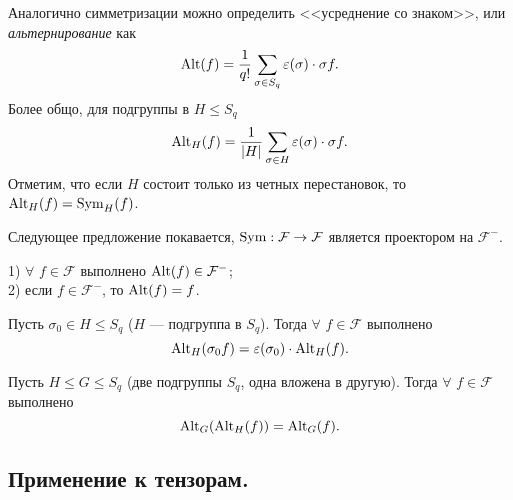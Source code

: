 
 
Аналогично симметризации можно определить <<усреднение со знаком>>, или {\it альтернирование} как
$$\mathop{\rm Alt}\nolimits (f) = \dfrac{1}{q!} \sum\limits_{\sigma \in S_q} \varepsilon(\sigma) \cdot \sigma f .$$
Более общо, %
для подгруппы в $H\leq S_q$
$$\mathop{\rm Alt}\nolimits_H(f) = \dfrac{1}{|H|} \sum\limits_{\sigma \in H} \varepsilon(\sigma) \cdot \sigma f .$$
Отметим, что если $H$ состоит только из четных перестановок, то $\mathop{\rm Alt}\nolimits_H(f) = \mathop{\rm Sym}\nolimits_H(f)$.



Следующее предложение покавается,  $\mathop{\rm Sym}\nolimits : \mathcal{F} \to \mathcal{F}$ является проектором на 
$\mathcal{F}^-$.

\begin{predl}
1) $\forall$ $f \in \mathcal{F} $ выполнено $\mathop{\rm Alt}\nolimits (f) \in \mathcal{F}^- $;\\
2) если $f \in \mathcal{F}^- $, то $\mathop{\rm Alt}\nolimits (f)=f$.
\end{predl}



\begin{lem}\label{premix_alt}
Пусть $\sigma_0 \in H \leq S_q$ ($H$ --- подгруппа в  $S_q$). Тогда
$\forall$ $f \in \mathcal{F} $ выполнено
$$\mathop{\rm Alt}\nolimits_H(\sigma_0f) = \varepsilon (\sigma_0)\cdot \mathop{\rm Alt}\nolimits_H (f) .$$
\end{lem}


 
\begin{lem}\label{double_mix_alt}
Пусть $H\leq G\leq S_q$ (две подгруппы $S_q$, одна вложена в другую). Тогда
$\forall$ $f \in \mathcal{F} $ выполнено
$$\mathop{\rm Alt}\nolimits_G (\mathop{\rm Alt}\nolimits_H(f)) = \mathop{\rm Alt}\nolimits_G (f) .$$
\end{lem}




\subsection{Применение к тензорам.}


